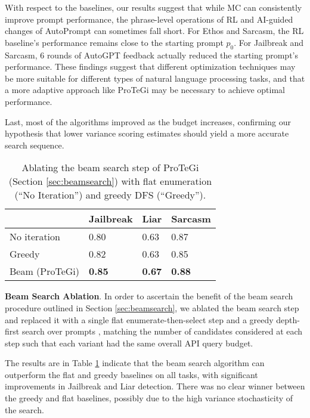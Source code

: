 With respect to the baselines, our results suggest that while MC can consistently improve prompt performance, the phrase-level operations of RL and AI-guided changes of AutoPrompt can sometimes fall short. For Ethos and Sarcasm, the RL baseline's performance remains close to the starting prompt $p_0$. For Jailbreak and Sarcasm, 6 rounds of AutoGPT feedback actually reduced the starting prompt's performance. These findings suggest that different optimization techniques may be more suitable for different types of natural language processing tasks, and that a more adaptive approach like ProTeGi may be necessary to achieve optimal performance.

Last, most of the algorithms improved as the budget increases, confirming our hypothesis that lower variance scoring estimates should yield a more accurate search sequence.

\begin{table}[]
\centering
\begin{tabular}{l|lll}
          & Jailbreak & Liar & Sarcasm \\ \hline
No iteration  &   0.80     &  0.63  &  0.87   \\
Greedy    &     0.82      &   0.63    &  0.85  \\
Beam (ProTeGi)    &    \textbf{0.85}      &   \textbf{0.67}    &  \textbf{0.88}  \\
\end{tabular}
\caption{Ablating the beam search step of ProTeGi (Section \ref{sec:beamsearch}) with flat enumeration (``No Iteration'') and greedy DFS (``Greedy'').}
\label{tab:beamablation}
\end{table}

\textbf{Beam Search Ablation}. In order to ascertain the benefit of the beam search procedure outlined in Section \ref{sec:beamsearch}, we ablated the beam search step and replaced it with a single flat enumerate-then-select step \cite{gao2020making} and a greedy depth-first search over prompts \cite{deng2022rlprompt}, matching the number of candidates considered at each step such that each variant had the same overall API query budget. 

The results are in Table \ref{tab:beamablation} indicate that the beam search algorithm can outperform the flat and greedy baselines on all tasks, with significant improvements in Jailbreak and Liar detection. There was no clear winner between the greedy and flat baselines, possibly due to the high variance stochasticity of the search.

